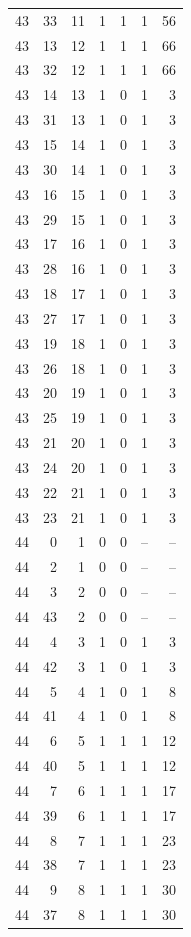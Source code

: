 \begin{longtable}{rrrrrrr}
43 & 33 & 11 & 1 & 1 & 1 & 56\\
43 & 13 & 12 & 1 & 1 & 1 & 66\\
43 & 32 & 12 & 1 & 1 & 1 & 66\\
43 & 14 & 13 & 1 & 0 & 1 & 3\\
43 & 31 & 13 & 1 & 0 & 1 & 3\\
43 & 15 & 14 & 1 & 0 & 1 & 3\\
43 & 30 & 14 & 1 & 0 & 1 & 3\\
43 & 16 & 15 & 1 & 0 & 1 & 3\\
43 & 29 & 15 & 1 & 0 & 1 & 3\\
43 & 17 & 16 & 1 & 0 & 1 & 3\\
43 & 28 & 16 & 1 & 0 & 1 & 3\\
43 & 18 & 17 & 1 & 0 & 1 & 3\\
43 & 27 & 17 & 1 & 0 & 1 & 3\\
43 & 19 & 18 & 1 & 0 & 1 & 3\\
43 & 26 & 18 & 1 & 0 & 1 & 3\\
43 & 20 & 19 & 1 & 0 & 1 & 3\\
43 & 25 & 19 & 1 & 0 & 1 & 3\\
43 & 21 & 20 & 1 & 0 & 1 & 3\\
43 & 24 & 20 & 1 & 0 & 1 & 3\\
43 & 22 & 21 & 1 & 0 & 1 & 3\\
43 & 23 & 21 & 1 & 0 & 1 & 3\\
44 & 0 & 1 & 0 & 0 & -- & --\\
44 & 2 & 1 & 0 & 0 & -- & --\\
44 & 3 & 2 & 0 & 0 & -- & --\\
44 & 43 & 2 & 0 & 0 & -- & --\\
44 & 4 & 3 & 1 & 0 & 1 & 3\\
44 & 42 & 3 & 1 & 0 & 1 & 3\\
44 & 5 & 4 & 1 & 0 & 1 & 8\\
44 & 41 & 4 & 1 & 0 & 1 & 8\\
44 & 6 & 5 & 1 & 1 & 1 & 12\\
44 & 40 & 5 & 1 & 1 & 1 & 12\\
44 & 7 & 6 & 1 & 1 & 1 & 17\\
44 & 39 & 6 & 1 & 1 & 1 & 17\\
44 & 8 & 7 & 1 & 1 & 1 & 23\\
44 & 38 & 7 & 1 & 1 & 1 & 23\\
44 & 9 & 8 & 1 & 1 & 1 & 30\\
44 & 37 & 8 & 1 & 1 & 1 & 30\\

\end{longtable}
